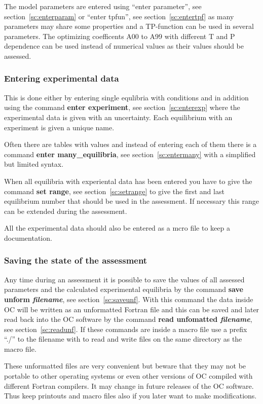 \documentclass[11pt]{article}
\begin{document}
The model parameters are entered using ``enter parameter'', see
section~\ref{sc:enterparam} or ``enter tpfun'', see
section~\ref{sc:entertpf} as many parameters may share some properties
and a TP-function can be used in several parameters.  The optimizing
coefficents A00 to A99 with different T and P dependence can be used
instead of numerical values as their values should be assessed.

\subsubsection{Entering experimental data}

This is done either by entering single equlibria with conditions and
in addition using the command {\bf enter experiment}, see
section~\ref{sc:enterexp} where the experimental data is given with an
uncertainty.  Each equilibrium with an experiment is given a unique
name.

Often there are tables with values and instead of entering each of
them there is a command {\bf enter many\_equilibria}, see
section~\ref{sc:entermany} with a simplified but limited syntax.

When all equilibria with experiental data has been entered you have to
give the command {\bf set range}, see section~\ref{sc:setrange} to give
the first and last equilibrium number that should be used in the
assessment.  If necessary this range can be extended during the
assessment.

All the experimental data should also be entered as a mcro file to
keep a documentation.

\subsubsection{Saving the state of the assessment}

Any time during an assessment it is possible to save the values of all
assessed parameters and the calculated experimental equilibria by the
command {\bf save unform {\em filename}}, see
section~\ref{sc:saveunf}.  With this command the data inside OC will
be written as an unformatted Fortran file and this can be saved and
later read back into the OC software by the command {\bf read
  unfomatted {\em filename}}, see section~\ref{sc:readunf}.  If these
commands are inside a macro file use a prefix ``./'' to the filename
with to read and write files on the same directory as the macro file.

These unformatted files are very convenient but beware that they may
not be portable to other operating systems or even other versions of
OC compiled with different Fortran compilers.  It may change in future
releases of the OC software.  Thus keep printouts and macro files also
if you later want to make modifications.
\end{document}
